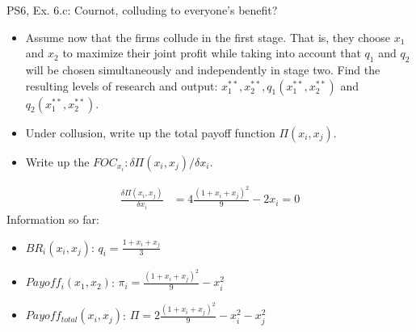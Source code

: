 \begin{frame}{PS6, Ex. 6.c: Cournot, colluding to everyone's benefit?}
    \begin{itemize}
    \item[(c)] Assume now that the firms collude in the first stage. That is, they choose $x_1$ and $x_2$ to maximize their joint profit while taking into account that $q_1$ and $q_2$ will be chosen simultaneously and independently in stage two. Find the resulting levels of research and output: $x_1^{**},x_2^{**},q_1(x_1^{**},x_2^{**})$ and $q_2(x_1^{**},x_2^{**})$.
    \end{itemize}
  \begin{multicols}{2}
    \begin{itemize}
      \item[(Step a)] Under collusion, write up the total payoff function $\Pi(x_i,x_j)$.
      \item[(Step b)] Write up the $FOC_{x_i}:\delta\Pi(x_i,x_j)/\delta x_i$.
    \end{itemize}
    \begin{align*}
      \frac{\delta\Pi(x_i,x_j)}{\delta x_i}&=4\frac{(1+x_i+x_j)^2}{9}-2x_i=0
    \end{align*}
    \vfill\null \columnbreak
    Information so far:
    \begin{itemize}
      \item[1] $BR_i(x_i,x_j)$: $q_i = \frac{1+x_i+x_j}{3}$
      \item[2] $Payoff_i(x_1,x_2)$: $\pi_i=\frac{(1+x_i+x_j)^2}{9}-x_i^2$
      \item[3] $Payoff_{total}(x_i,x_j)$: $\Pi=2\frac{(1+x_i+x_j)^2}{9}-x_i^2-x_j^2$
    \end{itemize}
    \vfill\null
  \end{multicols}
\end{frame}
